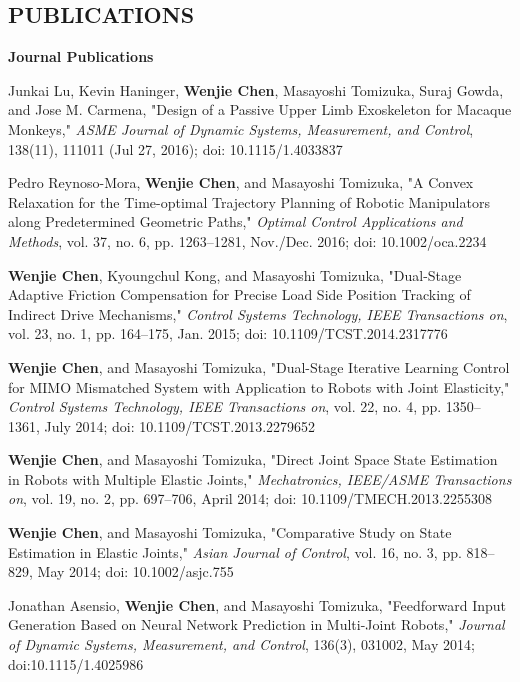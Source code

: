 \documentclass[UTF8,nofonts]{res}
\begin{document}
\begin{resume}
\section{PUBLICATIONS}
\vspace{0.1in}
    \textbf{Journal Publications} %
    \begin{etaremune}[start=7]
    \item Junkai Lu, Kevin Haninger, \textbf{Wenjie Chen}, Masayoshi Tomizuka, Suraj Gowda, and Jose M. Carmena, "Design of a Passive Upper Limb Exoskeleton for Macaque Monkeys," \emph{ASME Journal of Dynamic Systems, Measurement, and Control}, 138(11), 111011 (Jul 27, 2016); doi: 10.1115/1.4033837
    \item Pedro Reynoso-Mora, \textbf{Wenjie Chen}, and Masayoshi Tomizuka, "A Convex Relaxation for the Time-optimal Trajectory Planning of Robotic Manipulators along Predetermined Geometric Paths," \emph{Optimal Control Applications and Methods}, vol. 37, no. 6, pp. 1263--1281, Nov./Dec. 2016; doi: 10.1002/oca.2234
    \item \textbf{Wenjie Chen}, Kyoungchul Kong, and Masayoshi Tomizuka, "Dual-Stage Adaptive Friction Compensation for Precise Load Side Position Tracking of Indirect Drive Mechanisms," \emph{Control Systems Technology, IEEE Transactions on}, vol. 23, no. 1, pp. 164--175, Jan. 2015;  doi: 10.1109/TCST.2014.2317776
    \item \textbf{Wenjie Chen}, and Masayoshi Tomizuka, "Dual-Stage Iterative Learning Control for MIMO Mismatched System with Application to Robots with Joint Elasticity," \emph{Control Systems Technology, IEEE Transactions on}, vol. 22, no. 4, pp. 1350--1361, July 2014; doi: 10.1109/TCST.2013.2279652
    \item \textbf{Wenjie Chen}, and Masayoshi Tomizuka, "Direct Joint Space State Estimation in Robots with Multiple Elastic Joints," \emph{Mechatronics, IEEE/ASME Transactions on}, vol. 19, no. 2, pp. 697--706, April 2014; doi: 10.1109/TMECH.2013.2255308
    \item \textbf{Wenjie Chen}, and Masayoshi Tomizuka, "Comparative Study on State Estimation in Elastic Joints," \emph{Asian Journal of Control}, vol. 16, no. 3, pp. 818--829, May 2014; doi: 10.1002/asjc.755%
    \item Jonathan Asensio, \textbf{Wenjie Chen}, and Masayoshi Tomizuka, "Feedforward Input Generation Based on Neural Network Prediction in Multi-Joint Robots," \emph{Journal of Dynamic Systems, Measurement, and Control}, 136(3), 031002, May 2014;   doi:10.1115/1.4025986
    \end{etaremune}


\end{resume}
\end{document}
